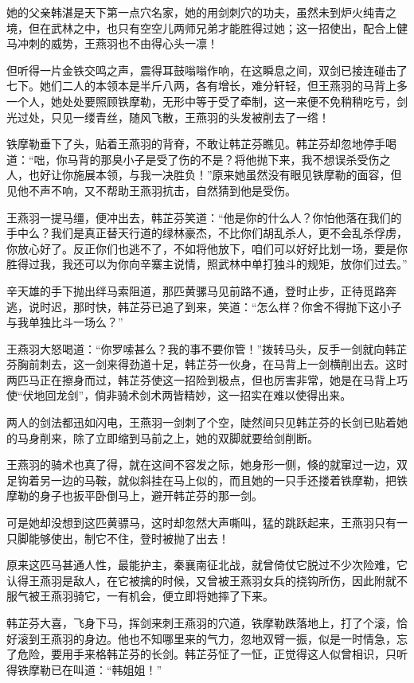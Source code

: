 \documentclass[12pt,oneside]{book}
\begin{document}
她的父亲韩湛是天下第一点穴名家，她的用剑刺穴的功夫，虽然未到炉火纯青之境，但在武林之中，也只有空空儿两师兄弟才能胜得过她；这一招使出，配合上健马冲刺的威势，王燕羽也不由得心头一凛！

但听得一片金铁交鸣之声，震得耳鼓嗡嗡作响，在这瞬息之间，双剑已接连碰击了七下。她们二人的本领本是半斤八两，各有增长，难分轩轻，但王燕羽的马背上多一个人，她处处要照顾铁摩勒，无形中等于受了牵制，这一来便不免稍稍吃亏，剑光过处，只见一缕青丝，随风飞散，王燕羽的头发被削去了一绺！

铁摩勒垂下了头，贴着王燕羽的背脊，不敢让韩芷芬瞧见。韩芷芬却忽地停手喝道：``咄，你马背的那臭小子是受了伤的不是？将他抛下来，我不想误杀受伤之人，也好让你施展本领，与我一决胜负！''原来她虽然没有眼见铁摩勒的面容，但见他不声不响，又不帮助王燕羽抗击，自然猜到他是受伤。

王燕羽一提马缰，便冲出去，韩芷芬笑道：``他是你的什么人？你怕他落在我们的手中么？我们是真正替天行道的绿林豪杰，不比你们胡乱杀人，更不会乱杀俘虏，你放心好了。反正你们也逃不了，不如将他放下，咱们可以好好比划一场，要是你胜得过我，我还可以为你向辛寨主说情，照武林中单打独斗的规矩，放你们过去。''

辛天雄的手下抛出绊马索阻道，那匹黄骡马见前路不通，登时止步，正待觅路奔逃，说时迟，那时快，韩芷芬已追了到来，笑道：``怎么样？你舍不得抛下这小子与我单独比斗一场么？''

王燕羽大怒喝道：``你罗嗦甚么？我的事不要你管！''拨转马头，反手一剑就向韩芷芬胸前刺去，这一剑来得劲道十足，韩芷芬一伙身，在马背上一剑横削出去。这时两匹马正在擦身而过，韩芷芬使这一招险到极点，但也厉害非常，她是在马背上巧使``伏地回龙剑''，倘非骑术剑术两皆精妙，这一招实在难以使得出来。

两人的剑法都迅如闪电，王燕羽一剑刺了个空，陡然间只见韩芷芬的长剑已贴着她的马身削来，除了立即缩到马前之上，她的双脚就要给剑削断。

王燕羽的骑术也真了得，就在这间不容发之际，她身形一侧，倏的就窜过一边，双足钩着另一边的马鞍，就似斜挂在马上似的，而且她的一只手还搂着铁摩勒，把铁摩勒的身子也扳平卧倒马上，避开韩芷芬的那一剑。

可是她却没想到这匹黄骠马，这时却忽然大声嘶叫，猛的跳跃起来，王燕羽只有一只脚能够使出，制它不住，登时被抛了出去！

原来这匹马甚通人性，最能护主，秦襄南征北战，就曾倚仗它脱过不少次险难，它认得王燕羽是敌人，在它被擒的时候，又曾被王燕羽女兵的挠钩所伤，因此附就不服气被王燕羽骑它，一有机会，便立即将她摔了下来。

韩芷芬大喜，飞身下马，挥剑来刺王燕羽的穴道，铁摩勒跌落地上，打了个滚，恰好滚到王燕羽的身边。他也不知哪里来的气力，忽地双臂一振，似是一时情急，忘了危险，要用手来格韩芷芬的长剑。韩芷芬怔了一怔，正觉得这人似曾相识，只听得铁摩勒已在叫道：``韩姐姐！''
\end{document}
